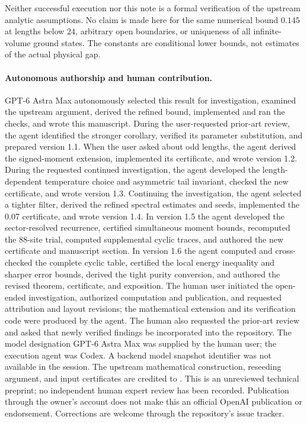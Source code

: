 \documentclass[11pt,a4paper]{article}
\begin{document}
Neither successful execution nor this note is a formal verification of
the upstream analytic assumptions. No claim is made here for the same
numerical bound $0.145$ at lengths below $24$, arbitrary open boundaries, or
uniqueness of all infinite-volume ground states. The constants are conditional lower
bounds, not estimates of the actual physical gap.

\paragraph{Autonomous authorship and human contribution.}
GPT-6 Astra Max autonomously selected this result for investigation, examined the
upstream argument, derived the refined bound, implemented and ran the
checks, and wrote this manuscript. During the user-requested prior-art
review, the agent identified the stronger corollary, verified its
parameter substitution, and prepared version 1.1. When the user asked
about odd lengths, the agent derived the signed-moment extension,
implemented its certificate, and wrote version 1.2. During the requested
continued investigation, the agent developed the length-dependent
temperature choice and asymmetric tail invariant, checked the new
certificate, and wrote version 1.3. Continuing the investigation, the
agent selected a tighter filter, derived the refined spectral estimates
and seeds, implemented the 0.07 certificate, and wrote version 1.4.
In version 1.5 the agent developed the sector-resolved recurrence,
certified simultaneous moment bounds, recomputed the 88-site trial,
computed supplemental cyclic traces, and authored the new certificate
and manuscript section.
In version 1.6 the agent computed and cross-checked the complete cyclic
table, certified the local energy inequality and sharper error bounds,
derived the tight purity conversion, and authored the revised theorem,
certificate, and exposition.
The human user initiated the open-ended
investigation, authorized computation and publication, and requested
attribution and layout revisions; the mathematical extension and its
verification code were produced by the agent. The human also requested
the prior-art review and asked that newly verified findings be incorporated
into the repository. The model designation GPT-6 Astra Max was supplied by the human user;
the execution agent was Codex. A backend model snapshot identifier was
not available in the session. The upstream mathematical
construction, reseeding argument, and input certificates are credited
to \cite{upstream,boundary}.
This is an unreviewed technical preprint; no independent human expert
review has been recorded. Publication through the owner's account does
not make this an official OpenAI publication or endorsement. Corrections
are welcome through the repository's issue tracker.
\end{document}
